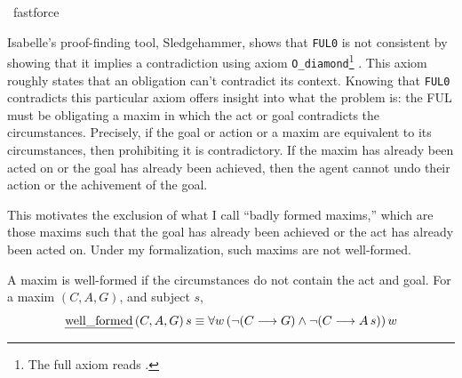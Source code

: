 \begin{isabellebody}
\ fastforce%
\endisatagproof
{\isafoldproof}%
%
\isadelimproof
%
\endisadelimproof
%
\begin{isamarkuptext}%
Isabelle's proof-finding tool, Sledgehammer, shows that 
\texttt{FUL0} is not consistent by showing that it implies a contradiction 
using axiom \texttt{O\_diamond}\footnote{The full axiom reads .} \citep{sledgehammer}. 
This axiom roughly states that an obligation can't contradict its context. Knowing that \texttt{FUL0}
contradicts this particular axiom offers insight into what the problem is: the FUL must be obligating 
a maxim in which the act or goal contradicts the circumstances. Precisely, if the goal or action
or a maxim are equivalent to its circumstances, then prohibiting it is contradictory. If the maxim has already been 
acted on or the goal has already been achieved, then the agent cannot undo their action or the achivement 
of the goal. 

This motivates the exclusion of what I call ``badly formed maxims,'' which are those maxims such that 
the goal has already been achieved or the act has already been acted on. Under my formalization, such maxims are
not well-formed. 

\begin{definition}
A maxim is well-formed if the circumstances do not contain the act and goal. For a maxim $(C, A, G)$, and subject $s$, 
$$ \text{\emph{well\_formed}} \, (C, A, G) \, s \equiv \forall w \, (\neg (C \longrightarrow G) \wedge \neg (C \longrightarrow A \, s)) \, w$$

\end{definition}


\end{isamarkuptext}
\end{isabellebody}
